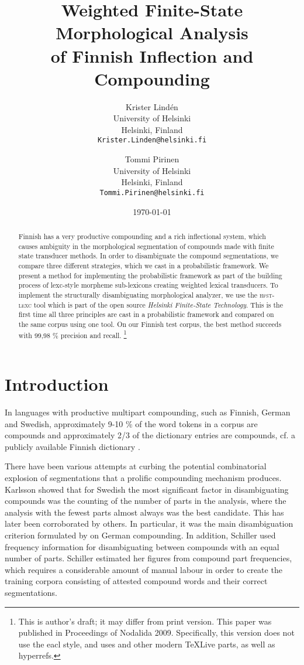 \documentclass[11pt]{article}
\title{Weighted Finite-State Morphological Analysis\\
  of Finnish Inflection and Compounding
  }
\author{Krister Lindén\\
  University of Helsinki\\
  Helsinki, Finland\\
  {\tt Krister.Linden@helsinki.fi} \and
  Tommi Pirinen\\
  University of Helsinki\\
  Helsinki, Finland\\
  {\tt Tommi.Pirinen@helsinki.fi} }
\date{\today}
\begin{document}
\maketitle
\begin{abstract}
  Finnish has a very productive compounding and a rich inflectional
  system, which causes ambiguity in the morphological segmentation of
  compounds made with finite state transducer methods. In order to
  disambiguate the compound segmentations, we compare three different
  strategies, which we cast in a probabilistic framework. We present a
  method for implementing the probabilistic framework as part of the
  building process of lexc-style morpheme sub-lexicons creating
  weighted lexical transducers. To implement the structurally
  disambiguating morphological analyzer, we use the \textsc{hfst-lexc}
  tool which is part of the open source \emph{Helsinki Finite-State
    Technology}. This is the first time all three principles are cast
  in a probabilistic framework and compared on the same corpus using
  one tool. On our Finnish test corpus, the best method succeeds with
  99,98 \% precision and recall.
  \footnote{This is author's draft; it may differ from print version.
  This paper was published in Proceedings of Nodalida 2009. Specifically,
  this version does not use the eacl style, and uses \XeLaTeX{} and other
  modern \TeX Live parts, as well as hyperrefs.}
\end{abstract}

\section{Introduction}

In languages with productive multipart compounding, such as Finnish,
German and Swedish, approximately 9-10 \% of the word tokens in a
corpus are compounds \cite{hedlund/2002} and approximately 2/3 of the
dictionary entries are compounds, cf. a publicly available Finnish
dictionary \cite{kotus/2007}.

There have been various attempts at curbing the potential
combinatorial explosion of segmentations that a prolific compounding
mechanism produces. Karlsson \cite{karlsson/1992} showed that for
Swedish the most significant factor in disambiguating compounds was
the counting of the number of parts in the analysis, where the
analysis with the fewest parts almost always was the best
candidate. This has later been corroborated by others. In particular,
it was the main disambiguation criterion formulated by
\cite{schiller/2005} on German compounding. In addition, Schiller used
frequency information for disambiguating between compounds with an
equal number of parts. Schiller estimated her figures from compound
part frequencies, which requires a considerable amount of manual
labour in order to create the training corpora consisting of attested
compound words and their correct segmentations.
\end{document}
